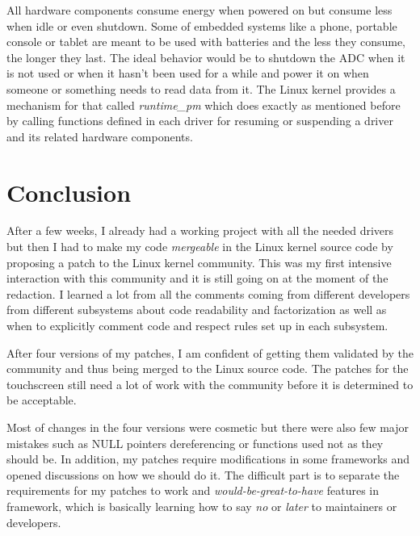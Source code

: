All hardware components consume energy when powered on but consume less when idle or even shutdown. Some of embedded systems like a phone, portable console or tablet are meant to be used with batteries and the less they consume, the longer they last. The ideal behavior would be to shutdown the ADC when it is not used or when it hasn't been used for a while and power it on when someone or something needs to read data from it. The Linux kernel provides a mechanism for that called \textit{runtime\_pm} which does exactly as mentioned before by calling functions defined in each driver for resuming or suspending a driver and its related hardware components.

\section{Conclusion}
After a few weeks, I already had a working project with all the needed drivers but then I had to make my code \textit{mergeable} in the Linux kernel source code by proposing a patch to the Linux kernel community. This was my first intensive interaction with this community and it is still going on at the moment of the redaction. I learned a lot from all the comments coming from different developers from different subsystems about code readability and factorization as well as when to explicitly comment code and respect rules set up in each subsystem.

After four versions of my patches, I am confident of getting them validated by the community and thus being merged to the Linux source code. The patches for the touchscreen still need a lot of work with the community before it is determined to be acceptable.

Most of changes in the four versions were cosmetic but there were also few major mistakes such as NULL pointers dereferencing or functions used not as they should be. In addition, my patches require modifications in some frameworks and opened discussions on how we should do it. The difficult part is to separate the requirements for my patches to work and \textit{would-be-great-to-have} features in framework, which is basically learning how to say \textit{no} or \textit{later} to maintainers or developers.
